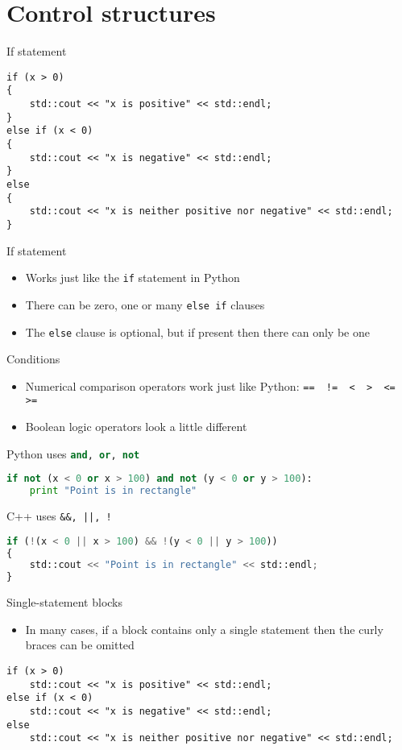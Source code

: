 \part{Control structures}
\frame{\partpage}

\begin{frame}[fragile]{If statement}
	\begin{lstlisting}
if (x > 0)
{
    std::cout << "x is positive" << std::endl;
}
else if (x < 0)
{
    std::cout << "x is negative" << std::endl;
}
else
{
    std::cout << "x is neither positive nor negative" << std::endl;
}
	\end{lstlisting}
\end{frame}

\begin{frame}[fragile]{If statement}
    \begin{itemize}
        \item Works just like the \lstinline{if} statement in Python \pause
        \item There can be zero, one or many \lstinline{else if} clauses \pause
        \item The \lstinline{else} clause is optional, but if present then there can only be one
    \end{itemize}
\end{frame}

\begin{frame}[fragile]{Conditions}
    \begin{itemize}
        \item Numerical comparison operators work just like Python:
        \lstinline{==  !=  <  >  <=  >=}
        \pause
        \item Boolean logic operators look a little different
    \end{itemize}
    \pause
    Python uses \lstinline[language=Python]{and, or, not}
    \begin{lstlisting}[language=Python]
if not (x < 0 or x > 100) and not (y < 0 or y > 100):
    print "Point is in rectangle"
    \end{lstlisting}
    \pause
    C++ uses \lstinline{&&, ||, !}
    \begin{lstlisting}[language=Python]
if (!(x < 0 || x > 100) && !(y < 0 || y > 100))
{
    std::cout << "Point is in rectangle" << std::endl;
}
    \end{lstlisting}
\end{frame}

\begin{frame}[fragile]{Single-statement blocks}
    \begin{itemize}
        \item In many cases, if a block contains only a single statement then the curly braces can be omitted
    \end{itemize}
    \begin{lstlisting}
if (x > 0)
    std::cout << "x is positive" << std::endl;
else if (x < 0)
    std::cout << "x is negative" << std::endl;
else
    std::cout << "x is neither positive nor negative" << std::endl;
    \end{lstlisting}
\end{frame}

